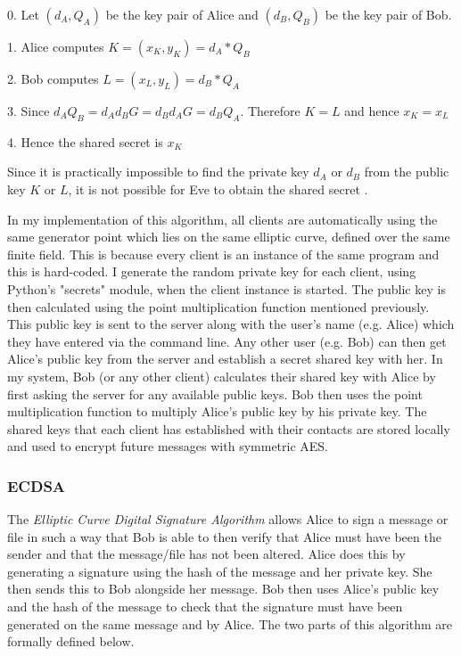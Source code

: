 \documentclass[12pt,a4paper]{article}
\begin{document}
\vspace{1mm}

0. \space Let $(d_A,Q_A)$ be the key pair of Alice and $(d_B,Q_B)$ be the key pair of Bob.

1. \space Alice computes $K = (x_K,y_K) = d_A * Q_B$

2. \space Bob computes $L = (x_L,y_L) = d_B * Q_A$

3. \space Since $d_AQ_B = d_Ad_BG = d_Bd_AG = d_BQ_A$. Therefore $K = L$ and hence $x_K = x_L$

4. \space Hence the shared secret is $x_K$

\vspace{1mm}

Since it is practically impossible to find the private key $d_A$ or $d_B$ from the public key $K$ or $L$, 
it is not possible for Eve to obtain the shared secret \cite{jurivsic1997elliptic,anoop2007elliptic,silverman2009arithmetic,brown2009standards}. 

\vspace{5mm}

In my implementation of this algorithm, all clients are automatically using the same generator point which lies 
on the same elliptic curve, defined over the same finite field. 
This is because every client is an instance of the same program and this is hard-coded. 
I generate the random private key for each client, using Python's "secrets" module, when the client instance is started. 
The public key is then calculated using the point multiplication function mentioned previously. 
This public key is sent to the server along with the user's name (e.g. Alice) which they have entered via the command line. 
Any other user (e.g. Bob) can then get Alice's public key from the server and establish a secret shared key with her. 
In my system, Bob (or any other client) calculates their shared key with Alice by first asking the server 
for any available public keys. 
Bob then uses the point multiplication function to multiply Alice's public key by his private key. 
The shared keys that each client has established with their contacts are stored locally 
and used to encrypt future messages with symmetric AES. 

\subsubsection{ECDSA}\noindent \label{ECDSA}
The \emph{Elliptic Curve Digital Signature Algorithm} allows Alice to sign a message or file in such a way that Bob is able to then 
verify that Alice must have been the sender and that the message/file has not been altered. 
Alice does this by generating a signature using the hash of the message and her private key. 
She then sends this to Bob alongside her message. 
Bob then uses Alice's public key and the hash of the message to check that the signature must have been generated on the same message and by Alice. 
The two parts of this algorithm are formally defined below. 
\end{document}
